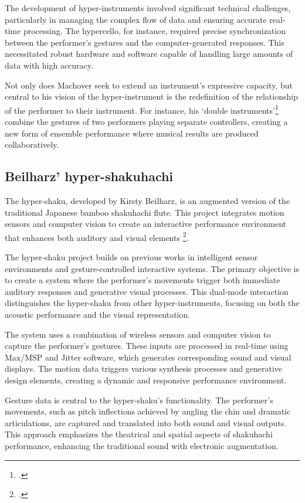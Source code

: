 \documentclass[12pt,twoside,maitrise]{dms_ks}
\theoremstyle{definition}
\begin{document}
{The development of hyper-instruments involved significant technical challenges, particularly in managing the complex flow of data and ensuring accurate real-time processing. 
The hypercello, for instance, required precise synchronization between the performer's gestures and the computer-generated responses. 
This necessitated robust hardware and software capable of handling large amounts of data with high accuracy.

Not only does Machover seek to extend an instrument's expressive capacity, but central to his vision of the hyper-instrument is the redefinition of the relationship of the performer to their instrument. 
For instance, his `double instruments'\footcite[189]{machover_hyper-instruments_1989} combine the gestures of two performers playing separate controllers, creating a new form of ensemble performance where musical results are produced collaboratively.

\subsection{Beilharz' hyper-shakuhachi}

The hyper-shaku, developed by Kirsty Beilharz, is an augmented version of the traditional Japanese bamboo shakuhachi flute. 
This project integrates motion sensors and computer vision to create an interactive performance environment that enhances both auditory and visual elements \footcite{beilharz_hyper-shaku_2006}. 

The hyper-shaku project builds on previous works in intelligent sensor environments and gesture-controlled interactive systems. 
The primary objective is to create a system where the performer's movements trigger both immediate auditory responses and generative visual processes. 
This dual-mode interaction distinguishes the hyper-shaku from other hyper-instruments, focusing on both the acoustic performance and the visual representation.

The system uses a combination of wireless sensors and computer vision to capture the performer's gestures. 
These inputs are processed in real-time using Max/MSP and Jitter software, which generates corresponding sound and visual displays. 
The motion data triggers various synthesis processes and generative design elements, creating a dynamic and responsive performance environment.

Gesture data is central to the hyper-shaku's functionality. 
The performer's movements, such as pitch inflections achieved by angling the chin and dramatic articulations, are captured and translated into both sound and visual outputs. 
This approach emphasizes the theatrical and spatial aspects of shakuhachi performance, enhancing the traditional sound with electronic augmentation.

}
\end{document}
